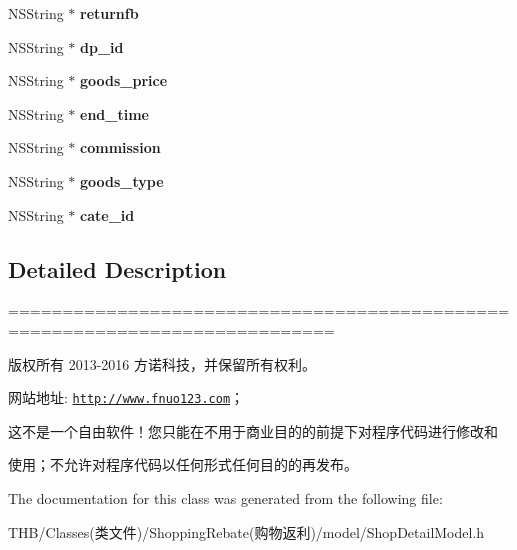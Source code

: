 \begin{DoxyCompactItemize}
N\+S\+String $\ast$ {\bfseries returnfb}
\item 
\mbox{\label{interface_shop_detail_model_aefb70dfb367830ed0fadd7df2430e409}} 
N\+S\+String $\ast$ {\bfseries dp\+\_\+id}
\item 
\mbox{\label{interface_shop_detail_model_a9f42f6b4032c974d1ca16db5900d67d4}} 
N\+S\+String $\ast$ {\bfseries goods\+\_\+price}
\item 
\mbox{\label{interface_shop_detail_model_aac8ca7a1596f57095b221b2dc11fc69e}} 
N\+S\+String $\ast$ {\bfseries end\+\_\+time}
\item 
\mbox{\label{interface_shop_detail_model_ae5b85157ce21fdf323766a0afedae3e1}} 
N\+S\+String $\ast$ {\bfseries commission}
\item 
\mbox{\label{interface_shop_detail_model_ad0665b3e8872f6fd24c04ee8a902ab76}} 
N\+S\+String $\ast$ {\bfseries goods\+\_\+type}
\item 
\mbox{\label{interface_shop_detail_model_a7a7377b90e85974fad4a3e5f5d539aa2}} 
N\+S\+String $\ast$ {\bfseries cate\+\_\+id}
\end{DoxyCompactItemize}


\subsection{Detailed Description}
============================================================================

版权所有 2013-\/2016 方诺科技，并保留所有权利。

网站地址\+: \href{http://www.fnuo123.com}{\tt http\+://www.\+fnuo123.\+com}； 



这不是一个自由软件！您只能在不用于商业目的的前提下对程序代码进行修改和

使用；不允许对程序代码以任何形式任何目的的再发布。 

 

The documentation for this class was generated from the following file\+:\begin{DoxyCompactItemize}
\item 
T\+H\+B/\+Classes(类文件)/\+Shopping\+Rebate(购物返利)/model/Shop\+Detail\+Model.\+h\end{DoxyCompactItemize}
